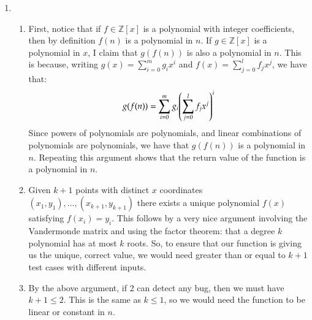 \documentclass[12pt]{article}
\theoremstyle{definitionstyle}
\def\mbb#1{\mathbb{#1}}
\def\bZ{\mbb{Z}}
\begin{document}
\begin{enumerate}[leftmargin=\labelsep]
        \newpage
        \item \begin{enumerate}
            \item First, notice that if $f \in \bZ[x]$ is a polynomial with integer coefficients, then by definition $f(n)$ is a polynomial in $n$. If $g \in \bZ[x]$ is a polynomial in $x$, I claim that $g(f(n))$ is also a polynomial in $n$. This is because, writing $g(x) = \sum_{i=0}^{m} g_ix^i$ and $f(x) = \sum_{j=0}^{l} f_jx^j$, we have that:
            \begin{align*}
                g(f(n)) = \sum_{i=0}^m g_i \qty(\sum_{j=0}^{l} f_jx^j)^i
            \end{align*}
            Since powers of polynomials are polynomials, and linear combinations of polynomials are polynomials, we have that $g(f(n))$ is a polynomial in $n$. Repeating this argument shows that the return value of the function is a polynomial in $n$. 
            \item Given $k+1$ points with distinct $x$ coordinates $(x_1, y_1), \ldots, (x_{k+1}, y_{k+1})$ there exists a unique polynomial $f(x)$ satisfying $f(x_i)=y_i$. This follows by a very nice argument involving the Vandermonde matrix and using the factor theorem: that a degree $k$ polynomial has at most $k$ roots. So, to ensure that our function is giving us the unique, correct value, we would need greater than or equal to $k+1$ test cases with different inputs. 
            \item By the above argument, if 2 can detect any bug, then we must have $k+1 \leq 2$. This is the same as $k \leq 1$, so we would need the function to be linear or constant in $n$.
        \end{enumerate}
    \end{enumerate}
\end{document}
